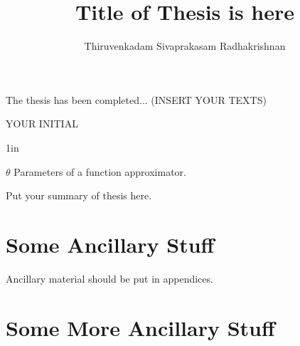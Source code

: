 \documentclass{uicthesi}
\begin{document}

\title{Title of Thesis is here}
\author{Thiruvenkadam Sivaprakasam Radhakrishnan}
\pdegrees{}
\maketitle




\acknowledgements
{The thesis has been completed... (INSERT YOUR TEXTS)\\

  \begin{flushright}YOUR INITIAL\end{flushright}}


\tableofcontents
\listoftables
\listoffigures
\listofabbreviations
\begin{list}
  {}
  {\setlength
    {}{1in}
    \setlength{\leftmargin}{1.5in}
    \setlength{\labelsep}{.5in}
    \setlength{\rightmargin}{\leftmargin}}
  \item[$\theta$\hfill] Parameters of a function approximator.
\end{list}

\summary
Put your summary of thesis here.









\appendices
\newpage
\appendix

\chapter{Some Ancillary Stuff}

Ancillary material should be put in appendices.

\chapter{Some More Ancillary Stuff}


\cite{Farine20162243}

\bibformb

\newpage
\end{document}
